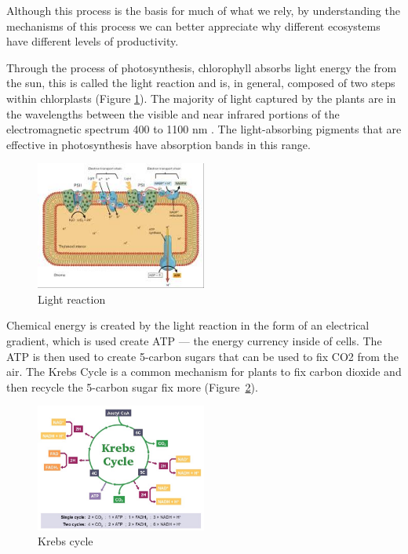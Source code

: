 Although this process is the basis for much of what we rely, by understanding the mechanisms of this process we can better appreciate why different ecosystems have different levels of productivity. 


Through the process of \gls{photosynthesis}, chlorophyll absorbs light energy the from the sun, this is called the light reaction and is, in general, composed of two steps within \gls{chlorplasts} (Figure \ref{fig:light_rxn}). The majority of light captured by the plants are in the wavelengths between the visible and near infrared portions of the electromagnetic spectrum 400 to 1100 nm \citep{stenberg2010visible}. The light-absorbing pigments that are effective in photosynthesis have absorption bands in this range.

\begin{figure}[htb]
	\centering
\includegraphics[width=0.5\textwidth]{graphics/light_rxn.jpg}
	\caption{Light reaction}
	\label{fig:light_rxn}
\end{figure}

Chemical energy is created by the light reaction in the form of an electrical gradient, which is used create ATP --- the energy currency inside of cells. The ATP is then used to create 5-carbon sugars that can be used to fix CO2 from the air. The Krebs Cycle is a common mechanism for plants to fix carbon dioxide and then recycle the 5-carbon sugar fix more \CO (Figure~\ref{fig:krebs-cycle_med}). 

\begin{figure}[htb]
	\centering
\includegraphics[width=0.50\textwidth]{graphics/krebs-cycle_med.jpeg}
	\caption{Krebs cycle}
	\label{fig:krebs-cycle_med}
\end{figure}



